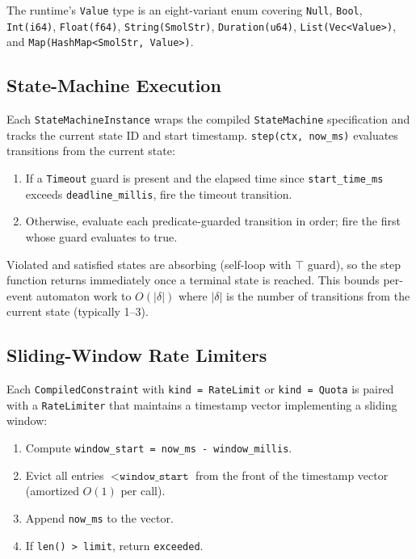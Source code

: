 \documentclass[sigconf]{acmart}
\begin{document}
The runtime's \texttt{Value} type is an eight-variant enum covering \texttt{Null},
\texttt{Bool}, \texttt{Int(i64)}, \texttt{Float(f64)},
\texttt{String(SmolStr)}, \texttt{Duration(u64)}, \texttt{List(Vec<Value>)},
and \texttt{Map(HashMap<SmolStr, Value>)}.

\subsection{State-Machine Execution}

Each \texttt{StateMachineInstance} wraps the compiled \texttt{StateMachine}
specification and tracks the current state ID and start timestamp.
\texttt{step(ctx, now\_ms)} evaluates transitions from the current state:
\begin{enumerate}
  \item If a \texttt{Timeout} guard is present and the elapsed time since
    \texttt{start\_time\_ms} exceeds \texttt{deadline\_millis}, fire the
    timeout transition.
  \item Otherwise, evaluate each predicate-guarded transition in order; fire
    the first whose guard evaluates to true.
\end{enumerate}

Violated and satisfied states are absorbing (self-loop with $\top$ guard), so
the step function returns immediately once a terminal state is reached. This
bounds per-event automaton work to $O(|\delta|)$ where $|\delta|$ is the number
of transitions from the current state (typically 1--3).

\subsection{Sliding-Window Rate Limiters}
\label{sec:ratelimit}

Each \texttt{CompiledConstraint} with \texttt{kind = RateLimit} or
\texttt{kind = Quota} is paired with a \texttt{RateLimiter} that maintains a
timestamp vector implementing a sliding window:

\begin{enumerate}
  \item Compute \texttt{window\_start = now\_ms - window\_millis}.
  \item Evict all entries $< \texttt{window\_start}$ from the front of the
    timestamp vector (amortized $O(1)$ per call).
  \item Append \texttt{now\_ms} to the vector.
  \item If \texttt{len() > limit}, return \texttt{exceeded}.
\end{enumerate}
\end{document}
